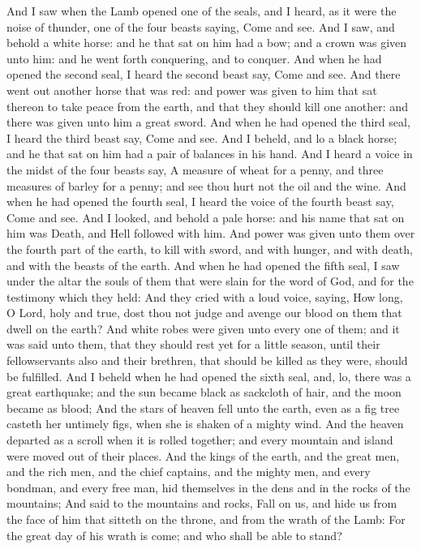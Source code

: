  And I saw when the Lamb opened one of the seals, and I
heard, as it were the noise of thunder, one of the four beasts saying,
Come and see.  And I saw, and behold a white horse: and he
that sat on him had a bow; and a crown was given unto him: and he went
forth conquering, and to conquer.  And when he had opened
the second seal, I heard the second beast say, Come and see.
 And there went out another horse that was red: and power
was given to him that sat thereon to take peace from the earth, and that
they should kill one another: and there was given unto him a great
sword.  And when he had opened the third seal, I heard the
third beast say, Come and see. And I beheld, and lo a black horse; and
he that sat on him had a pair of balances in his hand. 
And I heard a voice in the midst of the four beasts say, A measure of
wheat for a penny, and three measures of barley for a penny; and see
thou hurt not the oil and the wine.  And when he had
opened the fourth seal, I heard the voice of the fourth beast say, Come
and see.  And I looked, and behold a pale horse: and his
name that sat on him was Death, and Hell followed with him. And power
was given unto them over the fourth part of the earth, to kill with
sword, and with hunger, and with death, and with the beasts of the
earth.  And when he had opened the fifth seal, I saw under
the altar the souls of them that were slain for the word of God, and for
the testimony which they held:  And they cried with a
loud voice, saying, How long, O Lord, holy and true, dost thou not judge
and avenge our blood on them that dwell on the earth? 
And white robes were given unto every one of them; and it was said unto
them, that they should rest yet for a little season, until their
fellowservants also and their brethren, that should be killed as they
were, should be fulfilled.  And I beheld when he had
opened the sixth seal, and, lo, there was a great earthquake; and the
sun became black as sackcloth of hair, and the moon became as blood;
 And the stars of heaven fell unto the earth, even as a
fig tree casteth her untimely figs, when she is shaken of a mighty wind.
 And the heaven departed as a scroll when it is rolled
together; and every mountain and island were moved out of their places.
 And the kings of the earth, and the great men, and the
rich men, and the chief captains, and the mighty men, and every bondman,
and every free man, hid themselves in the dens and in the rocks of the
mountains;  And said to the mountains and rocks, Fall on
us, and hide us from the face of him that sitteth on the throne, and
from the wrath of the Lamb:  For the great day of his
wrath is come; and who shall be able to stand?

